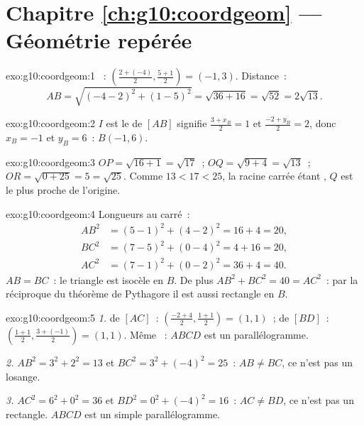 \section*{Chapitre \ref{ch:g10:coordgeom} --- Géométrie repérée}

\begin{solution}{exo:g10:coordgeom:1}
~: $\left(\frac{2 + (-4)}{2}, \frac{5 + 1}{2}\right) = (-1, 3)$.
Distance~:
\[
AB = \sqrt{(-4 - 2)^2 + (1 - 5)^2} = \sqrt{36 + 16} = \sqrt{52}
= 2\sqrt{13}.
\]
\end{solution}

\begin{solution}{exo:g10:coordgeom:2}
$I$ est le  de $[AB]$ signifie $\frac{3 + x_B}{2} = 1$ et
$\frac{-2 + y_B}{2} = 2$, donc $x_B = -1$ et $y_B = 6$~: $B(-1, 6)$.
\end{solution}

\begin{solution}{exo:g10:coordgeom:3}
$OP = \sqrt{16 + 1} = \sqrt{17}$~; $OQ = \sqrt{9 + 4} = \sqrt{13}$~;
$OR = \sqrt{0 + 25} = 5 = \sqrt{25}$. Comme $13 < 17 < 25$, la racine
carrée étant , $Q$ est le plus proche de l'origine.
\end{solution}

\begin{solution}{exo:g10:coordgeom:4}
Longueurs au carré~:
\begin{align*}
AB^2 &= (5-1)^2 + (4-2)^2 = 16 + 4 = 20, \\
BC^2 &= (7-5)^2 + (0-4)^2 = 4 + 16 = 20, \\
AC^2 &= (7-1)^2 + (0-2)^2 = 36 + 4 = 40 .
\end{align*}
$AB = BC$~: le triangle est isocèle en $B$. De plus
$AB^2 + BC^2 = 40 = AC^2$~: par la réciproque du théorème de Pythagore
il est aussi rectangle en $B$.
\end{solution}

\begin{solution}{exo:g10:coordgeom:5}
\emph{1.}  de $[AC]$~:
$\left(\frac{-2+4}{2}, \frac{1+1}{2}\right) = (1, 1)$~;  de
$[BD]$~: $\left(\frac{1+1}{2}, \frac{3+(-1)}{2}\right) = (1, 1)$. Même
~: $ABCD$ est un parallélogramme.

\emph{2.} $AB^2 = 3^2 + 2^2 = 13$ et $BC^2 = 3^2 + (-4)^2 = 25$~:
$AB \neq BC$, ce n'est pas un losange.

\emph{3.} $AC^2 = 6^2 + 0^2 = 36$ et $BD^2 = 0^2 + (-4)^2 = 16$~:
$AC \neq BD$, ce n'est pas un rectangle. $ABCD$ est un simple
parallélogramme.
\end{solution}

